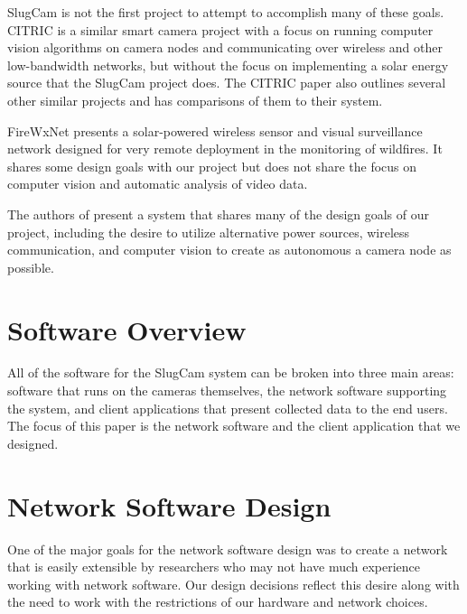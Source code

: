 SlugCam is not the first project to attempt to accomplish many of these goals.
CITRIC\cite{CITRIC} is a similar smart camera project with a focus on running
computer vision algorithms on camera nodes and communicating over wireless and
other low-bandwidth networks, but without the focus on implementing a solar
energy source that the SlugCam project does.  The CITRIC paper also outlines
several other similar projects and has comparisons of them to their system.

FireWxNet\cite{FireWxNet} presents a solar-powered wireless sensor and visual
surveillance network designed for very remote deployment in the monitoring of
wildfires. It shares some design goals with our project but does not share the
focus on computer vision and automatic analysis of video data.

The authors of \cite{10.1109/DSD.2008.23} present a system that shares many of
the design goals of our project, including the desire to utilize alternative
power sources, wireless communication, and computer vision to create as
autonomous a camera node as possible.


%
\section{Software Overview}

All of the software for the SlugCam system can be broken into three main areas:
software that runs on the cameras themselves, the network software supporting
the system, and client applications that present collected data to the end
users. The focus of this paper is the network software and the client
application that we designed.

\section{Network Software Design}

One of the major goals for the network software design was to create a
network that is easily extensible by researchers who may not have much
experience working with network software. Our design decisions reflect this
desire along with the need to work with the restrictions of our hardware and
network choices.

